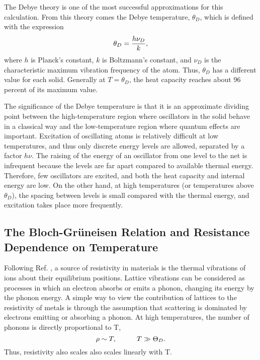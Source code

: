 \documentclass[11pt,letterpaper]{article}
\begin{document}
The Debye theory is one of the most successful approximations for this calculation. From this theory comes the Debye temperature, $\theta_D$, which is defined with the expression
\begin{equation}
    \theta_D = {h \nu_D \over k} ,
\end{equation}
where $h$ is Planck's constant, $k$ is Boltzmann's constant, and $\nu_D$ is the characteristic maximum vibration frequency of the atom. Thus, $\theta_D$ has a different value for each solid. Generally at $T=\theta_D$, the heat capacity reaches about 96 percent of its maximum value.

The significance of the Debye temperature is that it is an approximate dividing point between the high-temperature region where oscillators in the solid behave in a classical way and the low-temperature region where quantum effects are important. Excitation of oscillating atoms is relatively difficult at low temperatures, and thus only discrete energy levels are allowed, separated by a factor $h\nu$. The raising of the energy of an oscillator from one level to the net is infrequent because the levels are far apart compared to available thermal energy. Therefore, few oscillators are excited, and both the heat capacity and internal energy are low. On the other hand, at high temperatures (or temperatures above $\theta_D$), the spacing between levels is small compared with the thermal energy, and excitation takes place more frequently.

\subsection{The Bloch-Grüneisen Relation and Resistance Dependence on Temperature}

Following Ref. \cite{Ashcroft}, a source of resistivity in materials is the thermal vibrations of ions about their equilibrium positions. Lattice vibrations can be considered as processes in which an electron absorbs or emits a phonon, changing its energy by the phonon energy. A simple way to view the contribution of lattices to the resistivity of metals is through the assumption that scattering is dominated by electrons emitting or absorbing a phonon. At high temperatures, the number of phonons is directly proportional to T,
\begin{equation}
    \rho \sim T, \hspace{10mm} T \gg \Theta_D . \label{phonons high temp}
\end{equation}
Thus, resistivity also scales also scales linearly with T.
\end{document}
